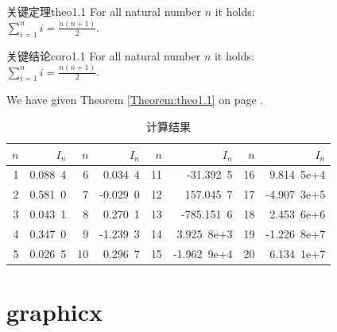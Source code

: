 \begin{theo}{关键定理}{theo1.1}
  For all natural number $n$ it holds:\\[2mm]
  $\displaystyle\sum\limits_{i=1}^n i = \frac{n(n+1)}{2}$.
\end{theo}

\begin{coro}{关键结论}{coro1.1}
  For all natural number $n$ it holds:\\[2mm]
  $\displaystyle\sum\limits_{i=1}^n i = \frac{n(n+1)}{2}$.
\end{coro}
We have given Theorem \ref{Theorem:theo1.1} on page \pageref{Theorem:theo1.1}.



\begin{table}[h]\begin{center}\color{darkblue}\caption{计算结果}\color{black}\label{tab1-1}
{\footnotesize
\begin{tabular}{r|r||r|r||r|r||r|r}\arrayrulecolor{darkblue}\hline\rowcolor{lightblue}
  $n$&$I_n$&$n$&$I_n$&$n$&$I_n$&$n$&$I_n$\\\hline
  1&0.088\ 4&6&0.034\ 4&11&-31.392\ 5&16&9.814\ 5e+4\\
  2&0.581\ 0&7&-0.029\ 0&12&157.045\ 7&17&-4.907\ 3e+5\\
  3&0.043\ 1&8&0.270\ 1&13&-785.151\ 6&18&2.453\ 6e+6\\
  4&0.347\ 0&9&-1.239\ 3&14&3.925\ 8e+3&19&-1.226\ 8e+7\\
  5&0.026\ 5&10&0.296\ 7&15&-1.962\ 9e+4&20&6.134\ 1e+7\\\hline
\end{tabular}}\end{center}\end{table}

\section{graphicx}

